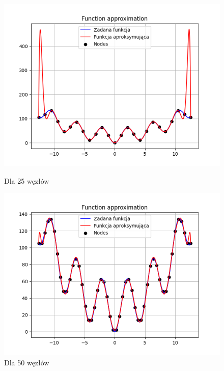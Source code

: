 \documentclass{article}
\begin{document}
\begin{figure}[H]
  \begin{minipage}[b]{0.49\textwidth}
    \begin{minipage}[b]{\textwidth}
      \includegraphics[width=\textwidth]{img46.png}
      \caption{Dla 25 węzłów}
    \end{minipage}
    \vspace*{\fill}
    \begin{minipage}[b]{\textwidth}
      \includegraphics[width=\textwidth]{img47.png}
      \caption{Dla 50 węzłów}
    \end{minipage}
  \end{minipage}
  \hfill
  \begin{minipage}[b]{0.49\textwidth}

\end{minipage}
\end{figure}
\end{document}
